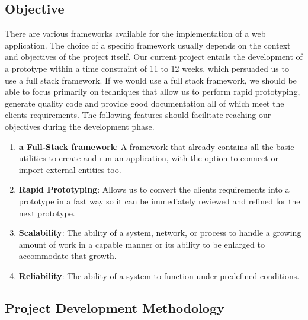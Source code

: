 \subsection{Objective}
There are various frameworks available for the implementation of a web application. The choice of a specific framework usually depends on the context and objectives of the project itself. Our current project entails the development of a prototype within a time constraint of 11 to 12 weeks, which persuaded us to use a full stack framework. If we would use a full stack framework, we should be able to focus primarily on techniques that allow us to perform rapid prototyping, generate quality code and provide good documentation all of which meet the clients requirements. The following features should facilitate reaching our objectives during the development phase.

\begin{enumerate}
	\item \textbf{a Full-Stack framework}: A framework that already contains all the basic utilities to create and run an application, with the option to connect or import external entities too.
	\item \textbf{Rapid Prototyping}: Allows us to convert the clients requirements into a prototype in a fast way so it can be immediately reviewed and refined for the next prototype.
	\item \textbf{Scalability}: The ability of a system, network, or process to handle a growing amount of work in a capable manner or its ability to be enlarged to accommodate that growth.\cite{wiki:scalability}
	\item \textbf{Reliability}: The ability of a system to function under predefined conditions.
\end{enumerate}
\subsection{Project Development Methodology} %

